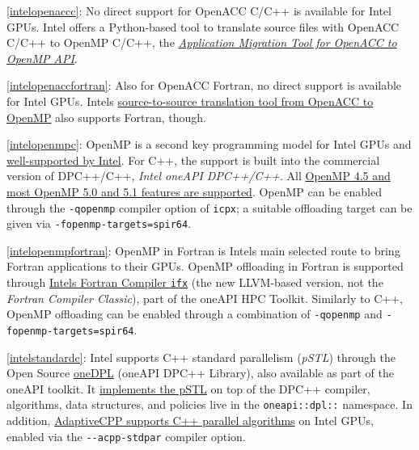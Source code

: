 \item \ref{intelopenaccc}: No direct support for OpenACC C/C++ is available for Intel GPUs. Intel offers a Python-based tool to translate source files with OpenACC C/C++ to OpenMP C/C++, the \href{https://github.com/intel/intel-application-migration-tool-for-openacc-to-openmp}{\emph{Application Migration Tool for OpenACC to OpenMP API}}.
\item \ref{intelopenaccfortran}: Also for OpenACC Fortran, no direct support is available for Intel GPUs. Intel\textquotesingle s \href{https://github.com/intel/intel-application-migration-tool-for-openacc-to-openmp}{source-to-source translation tool from OpenACC to OpenMP} also supports Fortran, though.
\item \ref{intelopenmpc}: OpenMP is a second key programming model for Intel GPUs and \href{https://www.intel.com/content/www/us/en/develop/documentation/get-started-with-cpp-fortran-compiler-openmp/top.html}{well-supported by Intel}. For C++, the support is built into the commercial version of DPC++/C++, \emph{Intel oneAPI DPC++/C++}. All \href{https://www.intel.com/content/www/us/en/developer/articles/technical/openmp-features-and-extensions-supported-in-icx.html}{OpenMP 4.5 and most OpenMP 5.0 and 5.1 features are supported}. OpenMP can be enabled through the \texttt{-qopenmp} compiler option of \texttt{icpx}; a suitable offloading target can be given via \texttt{-fopenmp-targets=spir64}.
\item \ref{intelopenmpfortran}: OpenMP in Fortran is Intel\textquotesingle s main selected route to bring Fortran applications to their GPUs. OpenMP offloading in Fortran is supported through \href{https://www.intel.com/content/www/us/en/docs/fortran-compiler/developer-guide-reference/2023-2/overview.html}{Intel\textquotesingle s Fortran Compiler \texttt{ifx}} (the new LLVM-based version, not the \emph{Fortran Compiler Classic}), part of the oneAPI HPC Toolkit. Similarly to C++, OpenMP offloading can be enabled through a combination of \texttt{-qopenmp} and \texttt{-fopenmp-targets=spir64}.
\item \ref{intelstandardc}: Intel supports C++ standard parallelism (\emph{pSTL}) through the Open Source \href{https://oneapi-src.github.io/oneDPL/index.html}{oneDPL} (oneAPI DPC++ Library), also available as part of the oneAPI toolkit. It \href{https://oneapi-src.github.io/oneDPL/parallel_api_main.html}{implements the pSTL} on top of the DPC++ compiler, algorithms, data structures, and policies live in the \texttt{oneapi::dpl::} namespace. In addition, \href{https://github.com/AdaptiveCpp/AdaptiveCpp/blob/develop/doc/stdpar.md}{AdaptiveCPP supports C++ parallel algorithms} on Intel GPUs, enabled via the \texttt{-\/-acpp-stdpar} compiler option.
